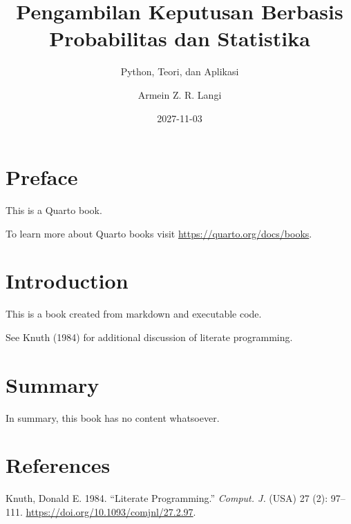 \documentclass[
  letterpaper,
  DIV=11,
  numbers=noendperiod]{scrreprt}
\title{Pengambilan Keputusan Berbasis Probabilitas dan Statistika}
\subtitle{Python, Teori, dan Aplikasi}
\author{Armein Z. R. Langi}
\date{2027-11-03}
\newlength{\cslhangindent}
\newenvironment{CSLReferences}[2] %
 {\begin{list}{}{%
  \setlength{\itemindent}{0pt}
  \setlength{\leftmargin}{0pt}
  \setlength{\parsep}{0pt}
  \ifodd #1
   \setlength{\leftmargin}{\cslhangindent}
   \setlength{\itemindent}{-1\cslhangindent}
  \fi
  \setlength{\itemsep}{#2\baselineskip}}}
 {\end{list}}
\renewcommand*\contentsname{Table of contents}
\newcommand\contentsname{Table of contents}
\begin{document}
\maketitle

\renewcommand*\contentsname{Table of contents}
{
\setcounter{tocdepth}{2}
\tableofcontents
}


\chapter*{Preface}\label{preface}


This is a Quarto book.

To learn more about Quarto books visit
\url{https://quarto.org/docs/books}.


\chapter{Introduction}\label{introduction}

This is a book created from markdown and executable code.

See Knuth (1984) for additional discussion of literate programming.


\chapter{Summary}\label{summary}

In summary, this book has no content whatsoever.


\chapter*{References}\label{references}


\protect{}\label{refs}
\begin{CSLReferences}{1}{1}
Knuth, Donald E. 1984. {``Literate Programming.''} \emph{Comput. J.}
(USA) 27 (2): 97--111. \url{https://doi.org/10.1093/comjnl/27.2.97}.

\end{CSLReferences}
\end{document}
